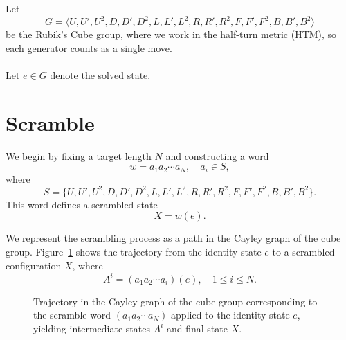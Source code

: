 \documentclass{article}
\begin{document}
Let
\[
	G = \langle U, U', U^2, D, D', D^2, L, L', L^2, R, R', R^2, F, F', F^2, B, B', B^2 \rangle
\]
be the Rubik’s Cube group, where we work in the half-turn metric (HTM), so each generator counts as a single move. \\ \\
Let $e \in G$ denote the solved state.

\section{Scramble}

We begin by fixing a target length \(N\) and constructing a word
\[
	w = a_1 a_2 \cdots a_N, \quad a_i \in S,
\]
where
\[
	S = \{U, U', U^2, D, D', D^2, L, L', L^2, R, R', R^2, F, F', F^2, B, B', B^2\}.
\]
This word defines a scrambled state
\[
	X = w(e).
\]

We represent the scrambling process as a path in the Cayley graph of the cube group. Figure~\ref{fig:paths1} shows the trajectory from the identity state \(e\) to a scrambled configuration \(X\), where
\[
	A^i = (a_1 a_2 \cdots a_i)(e), \quad 1 \le i \le N.
\]

\vspace{.5cm}

\begin{figure}[h]
	\begin{center}

		\caption{
			Trajectory in the Cayley graph of the cube group corresponding to the scramble word $(a_1 a_2 \cdots a_N)$ applied to the identity state $e$, yielding intermediate states $A^i$ and final state $X$.
		}
		\label{fig:paths1}
	\end{center}
\end{figure}
\end{document}
